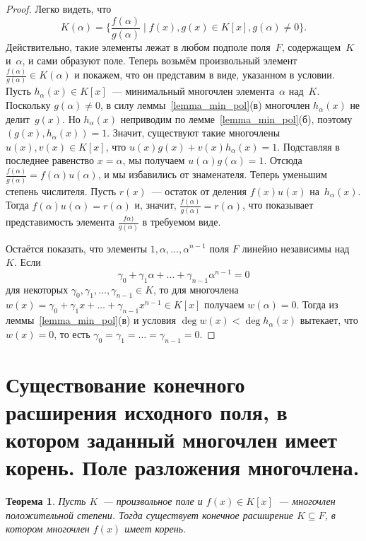 \documentclass[a4paper, 12pt]{article}
\newtheorem{theorem}{Теорема}
\theoremstyle{definition}
\theoremstyle{remark}
\begin{document}
\begin{proof}
Легко видеть, что
$$
K(\alpha) = \lbrace \frac{f(\alpha)}{g(\alpha)} \mid f(x), g(x) \in
K[x], g(\alpha) \ne 0 \rbrace.
$$
Действительно, такие элементы лежат в любом подполе поля~$F$,
содержащем~$K$ и~$\alpha$, и сами образуют поле. Теперь возьмём
произвольный элемент $\frac{f(\alpha)}{g(\alpha)} \in K(\alpha)$ и
покажем, что он представим в виде, указанном в условии. Пусть
$h_\alpha(x) \in K[x]$~--- минимальный многочлен элемента~$\alpha$
над~$K$. Поскольку $g(\alpha) \ne 0$, в силу
леммы~\ref{lemma_min_pol}(в) многочлен $h_\alpha(x)$ не
делит~$g(x)$. Но $h_\alpha(x)$ неприводим по
лемме~\ref{lemma_min_pol}(б), поэтому $(g(x), h_\alpha(x)) = 1$.
Значит, существуют такие многочлены $u(x), v(x) \in K[x]$, что $u(x)
g(x) + v(x) h_\alpha(x) = 1$. Подставляя в последнее равенство $x =
\alpha$, мы получаем $u(\alpha) g(\alpha) = 1$. Отсюда
$\frac{f(\alpha)}{g(\alpha)} = f(\alpha) u(\alpha)$, и мы избавились
от знаменателя. Теперь уменьшим степень числителя. Пусть $r(x)$~---
остаток от деления $f(x)u(x)$ на~$h_\alpha(x)$. Тогда $f(\alpha)
u(\alpha) = r(\alpha)$ и, значит, $\frac{f(\alpha)}{g(\alpha)} =
r(\alpha)$, что показывает представимость элемента
$\frac{f\alpha)}{g(\alpha)}$ в требуемом виде.

Остаётся показать, что элементы $1, \alpha, \ldots, \alpha^{n-1}$
поля $F$ линейно независимы над~$K$. Если $$\gamma_0 + \gamma_1
\alpha + \ldots + \gamma_{n-1} \alpha^{n-1} = 0$$ для некоторых
$\gamma_0, \gamma_1, \ldots, \gamma_{n-1} \in K$, то для многочлена
$w(x) = \gamma_0 + \gamma_1x + \ldots + \gamma_{n-1}x^{n-1} \in
K[x]$ получаем $w(\alpha) = 0$. Тогда из
леммы~\ref{lemma_min_pol}(в) и условия $\deg w(x) < \deg
h_\alpha(x)$ вытекает, что $w(x) = 0$, то есть $\gamma_0 = \gamma_1
= \ldots = \gamma_{n-1} = 0$.
\end{proof}


\section{Существование конечного расширения исходного поля, в котором заданный многочлен имеет корень. Поле разложения многочлена.}

\begin{theorem}
Пусть $K$~--- произвольное поле и $f(x)\in K[x]$~--- многочлен
положительной степени. Тогда существует конечное расширение
$K\subseteq F$, в котором многочлен $f(x)$ имеет корень.
\end{theorem}
\end{document}
